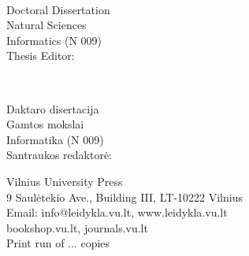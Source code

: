 \pagestyle{empty}
\cleardoublepage

\begin{flushleft}
    \thesisAuthorName \ \thesisAuthorSurname
    	
    \thesisTitleEN
    
    Doctoral Dissertation\\
    Natural Sciences\\
    Informatics (N 009)\\
    Thesis Editor: \thesisEditor
    
    \vspace{2cm}
    \thesisAuthorName \ \thesisAuthorSurname
    
    \thesisTitleLT
    
    Daktaro disertacija\\
    Gamtos mokslai\\
    Informatika (N 009)\\
    Santraukos redaktorė: \thesisEditor
\end{flushleft}

\vspace{165mm}
{
	\vspace*{\fill}
	
	\centering
    Vilnius University Press\\
    9 Saulėtekio Ave., Building III, LT-10222 Vilnius\\
    Email: info@leidykla.vu.lt, www.leidykla.vu.lt\\
    bookshop.vu.lt, journals.vu.lt \\
    Print run of ... copies\\
    
}